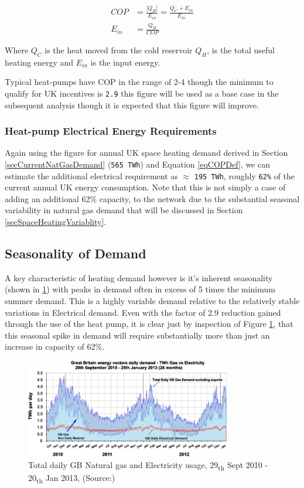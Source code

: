 \documentclass[11pt]{article}
\numberwithin{equation}{section}
\begin{document}
\begin{align}
\label{eqCOPDef}
COP &= \frac{|Q_H|}{E_{in}} = \frac{Q_C+E_{in}}{E_{in}}\\
E_{in} &= \frac{Q_H}{COP}
\end{align}

Where \(Q_C\) is the heat moved from the cold reservoir \(Q_H\), is the total useful heating energy and \(E_{in}\) is the input energy.

Typical heat-pumps have COP in the range of 2-4 though the minimum to qualify for UK incentives is \texttt{2.9} this figure will be used as a base case in the subsequent analysis though it is expected that this figure will improve.

\subsubsection{Heat-pump Electrical Energy Requirements}
\label{sec:orgeb82fa7}
Again using the figure for annual UK space heating demand derived in Section \ref{secCurrentNatGasDemand} (\texttt{565 TWh}) and Equation \ref{eqCOPDef}, we can estimate the additional electrical requirement as \(\approx\) \texttt{195 TWh}, roughly \texttt{62\%} of the current annual UK energy consumption. Note that this is not simply a case of adding an additional 62\% capacity, to the network due to the substantial seasonal variability in natural gas demand that will be discussed in Section \ref{secSpaceHeatingVariablity}.

\subsection{Seasonality of Demand \label{secSpaceHeatingVariablity}}
\label{sec:org1839b6d}
A key characteristic of heating demand however is it's inherent seasonality (shown in \ref{figHeatingSeasonality}) with peaks in demand often in excess of 5 times the minimum summer demand. This is a highly variable demand relative to the relatively stable variations in Electrical demand. Even with the factor of 2.9 reduction gained through the use of the heat pump, it is clear just by inspection of Figure \ref{figHeatingSeasonality}, that this seasonal spike in demand will require substantially more than just an increase in capacity of 62\%.

\begin{figure}[H]
\centering
\includegraphics[width=0.8\textwidth]{Figures/SeasonalEnergyVariation.jpg}
\caption{\label{figHeatingSeasonality}Total daily GB Natural gas and Electricity usage, 29\textsubscript{th} Sept 2010 - 20\textsubscript{th} Jan 2013, (Source:\cite{ukNatGasAndElecConsumption})}
\end{figure}
\end{document}
